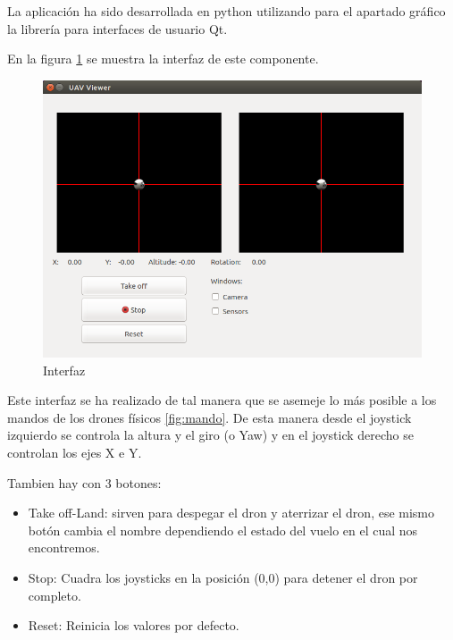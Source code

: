 La aplicación ha sido desarrollada en python utilizando para el apartado gráfico la librería
para interfaces de usuario Qt.

En la figura \ref{fig:interfazUavViewer} se muestra la interfaz de este componente.

\begin{figure}[H]
  \centering
  \includegraphics[scale=0.3]{imagenes/Uav_viewer_py.png}
  \caption{Interfaz}
  \label{fig:interfazUavViewer}
\end{figure}

Este interfaz se ha realizado de tal manera que se asemeje lo más posible a los mandos de los drones físicos \ref{fig:mando}. De esta manera desde el joystick izquierdo se controla la altura y el giro (o Yaw) y en el joystick derecho se controlan los ejes X e Y. 

Tambien hay con 3 botones:
\begin{itemize}
\item Take off-Land: sirven para despegar el dron y aterrizar el dron, ese mismo botón cambia el nombre dependiendo el estado del vuelo en el cual nos encontremos.
\item Stop: Cuadra los joysticks en la posición (0,0) para detener el dron por completo.
\item Reset: Reinicia los valores por defecto.
\end{itemize}

